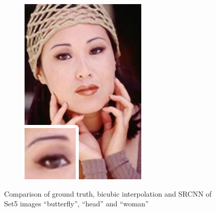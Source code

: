 \documentclass[
			fontsize = 12pt,
			paper = a4
			]
			{scrartcl}%
\newcommand{\?}{\ensuremath{^\texttt{\textbf [CITATION~NEEDED]}}}
\begin{document}
\begin{figure}[!ht]
\begin{subfigure}[b]{0.3\textwidth}
         \includegraphics[width=\textwidth]{fig/examples/woman_srcnn_x3}
     \end{subfigure}
        \caption{Comparison of ground truth, bicubic interpolation and SRCNN of Set5 images \enquote{butterfly}, \enquote{head} and \enquote{woman}}
        \label{fig:set5imagesI}
\end{figure}
\end{document}
